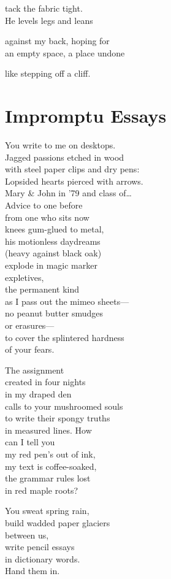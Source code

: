 \documentclass[twoside,10pt]{book}
\begin{document}
tack the fabric tight.\\
He levels legs and leans

against my back, hoping for\\
an empty space, a place undone

like stepping off a cliff.


\clearpage
\section{Impromptu Essays}

You write to me on desktops.\\
Jagged passions etched in wood\\
with steel paper clips and dry pens:\\
Lopsided hearts pierced with arrows.\\
Mary \& John in '79 and class of\ldots{}\\
Advice to one before\\
from one who sits now\\
knees gum-glued to metal,\\
his motionless daydreams\\
(heavy against black oak)\\
explode in magic marker\\
expletives,\\
the permanent kind\\
as I pass out the mimeo sheets---\\
no peanut butter smudges\\
or erasures---\\
to cover the splintered hardness\\
of your fears.

The assignment\\
created in four nights\\
in my draped den\\
calls to your mushroomed souls\\
to write their spongy truths\\
in measured lines. How\\
can I tell you\\
my red pen's out of ink,\\
my text is coffee-soaked,\\
the grammar rules lost\\
in red maple roots?

You sweat spring rain,\\
build wadded paper glaciers\\
between us,\\
write pencil essays\\
in dictionary words.\\
Hand them in.
\end{document}
